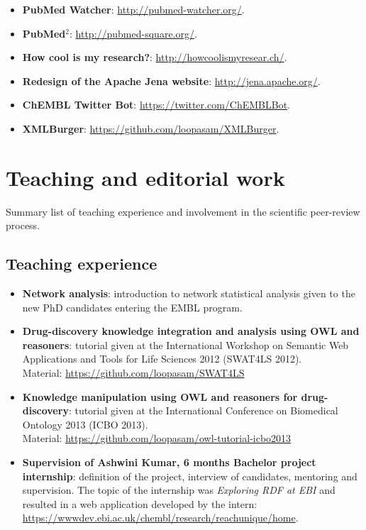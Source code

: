 \begin{itemize}
  \item \textbf{PubMed Watcher}: \url{http://pubmed-watcher.org/}.
  \item \textbf{PubMed$^{2}$}: \url{http://pubmed-square.org/}.
  \item \textbf{How cool is my research?}: \url{http://howcoolismyresear.ch/}.
  \item \textbf{Redesign of the Apache Jena website}: \url{http://jena.apache.org/}.
  \item \textbf{ChEMBL Twitter Bot}: \url{https://twitter.com/ChEMBLBot}.
  \item \textbf{XMLBurger}: \url{https://github.com/loopasam/XMLBurger}.
\end{itemize}

\chapter{Teaching and editorial work}
Summary list of teaching experience and involvement in the scientific peer-review process.
\section{Teaching experience}
\begin{itemize}
  \item \textbf{Network analysis}: introduction to network statistical analysis given to the new PhD candidates entering the EMBL program. 
  \item \textbf{Drug-discovery knowledge integration and analysis using OWL and reasoners}: tutorial given at the International Workshop on Semantic Web Applications and Tools for Life Sciences 2012 (SWAT4LS 2012). \\ Material: \url{https://github.com/loopasam/SWAT4LS}
  \item \textbf{Knowledge manipulation using OWL and reasoners for drug-discovery}: tutorial given at the International Conference on Biomedical Ontology 2013 (ICBO 2013). \\ Material: \url{https://github.com/loopasam/owl-tutorial-icbo2013}
  \item \textbf{Supervision of Ashwini Kumar, 6 months Bachelor project internship}: definition of the project, interview of candidates, mentoring and supervision. The topic of the internship was \emph{Exploring RDF at EBI} and resulted in a web application developed by the intern: \url{https://wwwdev.ebi.ac.uk/chembl/research/reachunique/home}.
\end{itemize}

